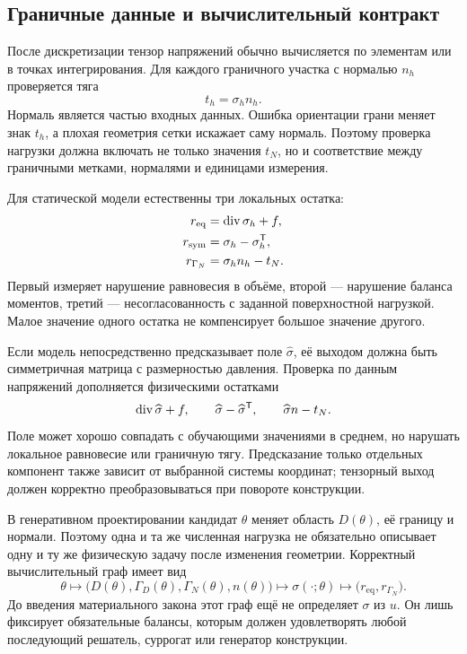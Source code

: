 \subsection{Граничные данные и вычислительный контракт}

После дискретизации тензор напряжений обычно вычисляется по элементам или в точках интегрирования. Для каждого граничного участка с нормалью $n_h$ проверяется тяга
\begin{equation}
\label{eq:discrete-traction-v02}
t_h=\sigma_h n_h.
\end{equation}
Нормаль является частью входных данных. Ошибка ориентации грани меняет знак $t_h$, а плохая геометрия сетки искажает саму нормаль. Поэтому проверка нагрузки должна включать не только значения $t_N$, но и соответствие между граничными метками, нормалями и единицами измерения.

Для статической модели естественны три локальных остатка:
\begin{align}
 r_{\mathrm{eq}}
 &=\operatorname{div}\sigma_h+f,
 \label{eq:equilibrium-residual-v02}\\
 r_{\mathrm{sym}}
 &=\sigma_h-\sigma_h^{\mathsf{T}},
 \label{eq:symmetry-residual-v02}\\
 r_{\Gamma_N}
 &=\sigma_h n_h-t_N.
 \label{eq:traction-boundary-residual-v02}
\end{align}
Первый измеряет нарушение равновесия в объёме, второй --- нарушение баланса моментов, третий --- несогласованность с заданной поверхностной нагрузкой. Малое значение одного остатка не компенсирует большое значение другого.

\begin{mlconnection}
Если модель непосредственно предсказывает поле $\widehat\sigma$, её выходом должна быть симметричная матрица с размерностью давления. Проверка по данным напряжений дополняется физическими остатками
\[
\operatorname{div}\widehat\sigma+f,
\qquad
\widehat\sigma-\widehat\sigma^{\mathsf{T}},
\qquad
\widehat\sigma n-t_N.
\]
Поле может хорошо совпадать с обучающими значениями в среднем, но нарушать локальное равновесие или граничную тягу. Предсказание только отдельных компонент также зависит от выбранной системы координат; тензорный выход должен корректно преобразовываться при повороте конструкции.
\end{mlconnection}

В генеративном проектировании кандидат $\theta$ меняет область $D(\theta)$, её границу и нормали. Поэтому одна и та же численная нагрузка не обязательно описывает одну и ту же физическую задачу после изменения геометрии. Корректный вычислительный граф имеет вид
\begin{equation}
\label{eq:design-stress-contract-v02}
\theta
\longmapsto
\bigl(D(\theta),\Gamma_D(\theta),\Gamma_N(\theta),n(\theta)\bigr)
\longmapsto
\sigma(\cdot;\theta)
\longmapsto
\bigl(r_{\mathrm{eq}},r_{\Gamma_N}\bigr).
\end{equation}
До введения материального закона этот граф ещё не определяет $\sigma$ из $u$. Он лишь фиксирует обязательные балансы, которым должен удовлетворять любой последующий решатель, суррогат или генератор конструкции.

